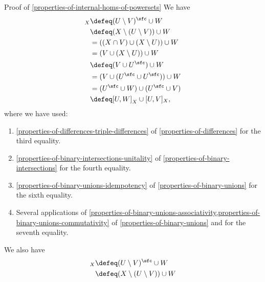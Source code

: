 \begin{Proof}{Proof of \cref{properties-of-internal-homs-of-powersets}}
    We have
    \begin{align*}
        [U\setminus V,W]_{X} &\defeq (U\setminus V)^{\sfc}\cup W\\
                             &\defeq (X\setminus(U\setminus V))\cup W\\
                             &=      ((X\cap V)\cup(X\setminus U))\cup W\\
                             &=      (V\cup(X\setminus U))\cup W\\
                             &\defeq (V\cup U^{\sfc})\cup W\\
                             &=      (V\cup(U^{\sfc}\cup U^{\sfc}))\cup W\\
                             &=      (U^{\sfc}\cup W)\cup(U^{\sfc}\cup V)\\
                             &\defeq [U,W]_{X}\cup[U,V]_{X},
    \end{align*}
    where we have used:
    \begin{enumerate}
        \item\label{proof-of-properties-of-internal-homs-of-powersets-interaction-with-differences-1}\cref{properties-of-differences-triple-differences} of \cref{properties-of-differences} for the third equality.
        \item\label{proof-of-properties-of-internal-homs-of-powersets-interaction-with-differences-2}\cref{properties-of-binary-intersections-unitality} of \cref{properties-of-binary-intersections} for the fourth equality.
        \item\label{proof-of-properties-of-internal-homs-of-powersets-interaction-with-differences-3}\cref{properties-of-binary-unions-idempotency} of \cref{properties-of-binary-unions} for the sixth equality.
        \item\label{proof-of-properties-of-internal-homs-of-powersets-interaction-with-differences-4}Several applications of \cref{properties-of-binary-unions-associativity,properties-of-binary-unions-commutativity} of \cref{properties-of-binary-unions} and for the seventh equality.
    \end{enumerate}
    We also have
    \begin{align*}
        [U\setminus V,W]_{X} &\defeq (U\setminus V)^{\sfc}\cup W\\
                             &\defeq (X\setminus(U\setminus V))\cup W\\

\end{align*}
\end{Proof}
